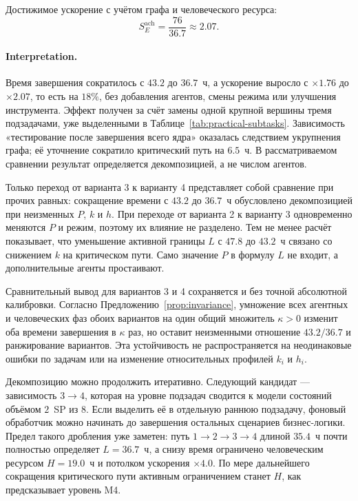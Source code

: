 \documentclass[12pt,a4paper]{article}
\theoremstyle{definition}
\begin{document}
Достижимое ускорение с учётом графа и человеческого ресурса:
\[
  S_E^{\text{ach}} = \frac{76}{36.7} \approx 2.07.
\]

\paragraph{Interpretation.}
Время завершения сократилось с $43.2$ до $36.7$~ч, а ускорение выросло с $\times 1.76$ до $\times 2.07$, то есть на $18\%$, без добавления агентов, смены режима или улучшения инструмента. Эффект получен за счёт замены одной крупной вершины тремя подзадачами, уже выделенными в Таблице~\ref{tab:practical-subtasks}. Зависимость «тестирование после завершения всего ядра» оказалась следствием укрупнения графа; её уточнение сократило критический путь на $6.5$~ч. В рассматриваемом сравнении результат определяется декомпозицией, а не числом агентов.

Только переход от варианта 3 к варианту 4 представляет собой сравнение при прочих равных: сокращение времени с $43.2$ до $36.7$~ч обусловлено декомпозицией при неизменных $P$, $k$ и $h$. При переходе от варианта 2 к варианту 3 одновременно меняются $P$ и режим, поэтому их влияние не разделено. Тем не менее расчёт показывает, что уменьшение активной границы $L$ с $47.8$ до $43.2$~ч связано со снижением $k$ на критическом пути. Само значение $P$ в формулу $L$ не входит, а дополнительные агенты простаивают.

Сравнительный вывод для вариантов 3 и 4 сохраняется и без точной абсолютной
калибровки. Согласно Предложению~\ref{prop:invariance}, умножение всех агентных
и человеческих фаз обоих вариантов на один общий множитель $\kappa>0$ изменит
оба времени завершения в $\kappa$ раз, но оставит неизменными отношение
$43.2/36.7$ и ранжирование вариантов. Эта устойчивость не распространяется на
неодинаковые ошибки по задачам или на изменение относительных профилей $k_i$ и
$h_i$.

Декомпозицию можно продолжить итеративно. Следующий кандидат --- зависимость $3 \to 4$, которая на уровне подзадач сводится к модели состояний объёмом $2$~SP из $8$. Если выделить её в отдельную раннюю подзадачу, фоновый обработчик можно начинать до завершения остальных сценариев бизнес-логики. Предел такого дробления уже заметен: путь $1 \to 2 \to 3 \to 4$ длиной $35.4$~ч почти полностью определяет $L = 36.7$~ч, а снизу время ограничено человеческим ресурсом $H = 19.0$~ч и потолком ускорения $\times 4.0$. По мере дальнейшего сокращения критического пути активным ограничением станет $H$, как предсказывает уровень M4.
\end{document}
